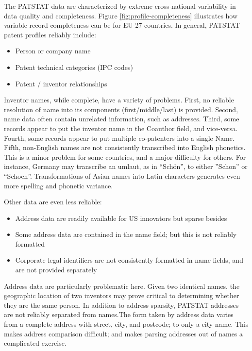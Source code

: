 \documentclass[11pt]{article}
\begin{document}
The PATSTAT data are characterized by extreme cross-national
variability in data quality and completeness. Figure
\ref{fig:profile-completeness} illustrates how variable record
completeness can be for EU-27 countries. In general, PATSTAT patent
profiles reliably include:
\begin{itemize}
\item Person or company name
\item Patent technical categories (IPC codes)
\item Patent / inventor relationships
\end{itemize}

Inventor names, while complete, have a variety of problems. First, no
reliable resolution of name into its components (first/middle/last) is
provided. Second, name data often contain unrelated information, such
as addresses. Third, some records appear to put the inventor name in
the Coauthor field, and vice-versa. Fourth, some records appear to put multiple
co-patenters into a single Name. Fifth, non-English names are not
consistently transcribed into English phonetics. This is a minor
problem for some countries, and a major difficulty for others. For
instance, Germany may transcribe an umlaut, as in
``Sch\"on'', to either ''Schon'' or  ``Schoen''. Transformations of
Asian names into Latin characters generates even more spelling and
phonetic variance.

Other data are even less reliable:
\begin{itemize}
\item Address data are readily available for US innovators but sparse besides
\item Some address data are contained in the name field; but this is
  not reliably formatted
\item Corporate legal identifiers are not consistently formatted in
  name fields, and are not provided separately
\end{itemize}

Address data are particularly problematic here. Given two identical
names, the geographic location of two inventors may prove critical to
determining whether they are the same person. In addition to address
sparsity, PATSTAT addresses are not reliably separated from names.The
form taken by address data varies from a complete address with street,
city, and postcode; to only a city name. This makes address
comparison difficult; and makes parsing addresses out of names a
complicated exercise.

\end{document}
